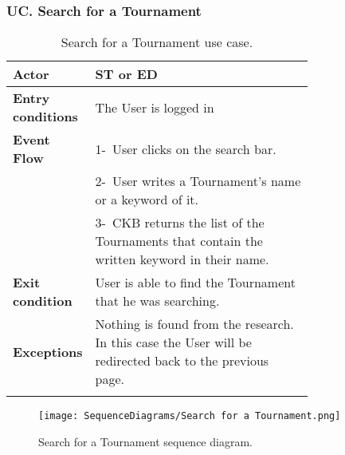\subsubsection*{UC\cuc . Search for a Tournament}
\begin{center}
    \begin{longtable}{|l|p{0.75\linewidth}|}
        \hline
        \textbf{Actor}            & ST or ED  \\
        \hline
        \textbf{Entry conditions} & The User is logged in  \\
        \hline
        \textbf{Event Flow}       & 1-\ User clicks on the search bar.       \\
        & 2-\ User writes a Tournament's name or a keyword of it. \\
        & 3-\ CKB returns the list of the Tournaments that contain the written keyword in their name.         \\
        \hline
        \textbf{Exit condition}   & User is able to find the Tournament that he was searching.        \\
        \hline
        \textbf{Exceptions}        & Nothing is found from the research. In this case the User will be redirected back to the previous page.\\
        \hline
        \caption{Search for a Tournament use case.}
        \label{tab: search_for_a_Tournament_use_case}
    \end{longtable}
\end{center}

\begin{figure}[H]
    \begin{center}
        \texttt{[image: SequenceDiagrams/Search for a Tournament.png]}
        \caption{Search for a Tournament sequence diagram.}
        \label{fig:search_for_a_Tournament_seqd}%
    \end{center}
\end{figure}

\newpage

